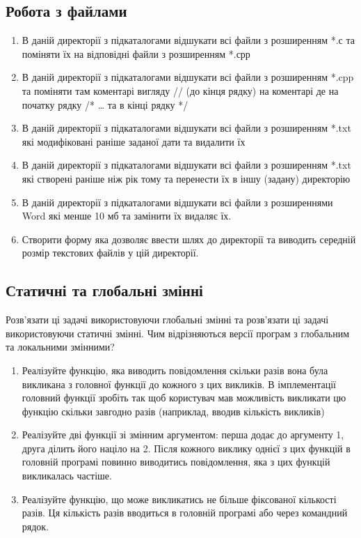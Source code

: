 \documentclass[]{article}
\begin{document}
\subsection{Робота з файлами}

\begin{enumerate}
\item
В даній директорії з підкаталогами відшукати всі файли з розширенням *.с
та поміняти їх на відповідні файли з розширенням *.срр
\item
В даній директорії з підкаталогами відшукати всі файли з розширенням
*.cpp та поміняти там коментарі вигляду // (до кінця рядку) на коментарі
де на початку рядку /* \ldots{} та в кінці рядку */
\item
В даній директорії з підкаталогами відшукати всі файли з розширенням
*.txt які модифіковані раніше заданої дати та видалити їх
\item
В даній директорії з підкаталогами відшукати всі файли з розширенням
*.txt які створені раніше ніж рік тому та перенести їх в іншу (задану)
директорію
\item
В даній директорії з підкаталогами відшукати всі файли з розширеннями
Word які менше 10 мб та замінити їх видаляє їх.
\item
Створити форму яка дозволяє ввести шлях до директорії та виводить
середній розмір текстових файлів у цій директорії.

\end{enumerate}

\subsection{ Статичні та глобальні змінні}

Розв'язати ці задачі використовуючи глобальні змінні та розв'язати ці
задачі використовуючи статичні змінні. Чим відрізняються версії програм
з глобальним та локальними змінними?
\begin{enumerate}
\item
Реалізуйте функцію, яка виводить повідомлення скільки разів вона була
викликана з головної функції до кожного з цих викликів. В імплементації
головний функції зробіть так щоб користувач мав можливість викликати цю
функцію скільки завгодно разів (наприклад, вводив кількість викликів)
\item
Реалізуйте дві функції зі змінним аргументом: перша додає до аргументу
1, друга ділить його націло на 2. Після кожного виклику однієї з цих
функцій в головній програмі повинно виводитись повідомлення, яка з цих
функцій викликалась частіше.
\item
Реалізуйте функцію, що може викликатись не більше фіксованої кількості
разів. Ця кількість разів вводиться в головній програмі або через
командний рядок.

\end{enumerate}
\end{document}
